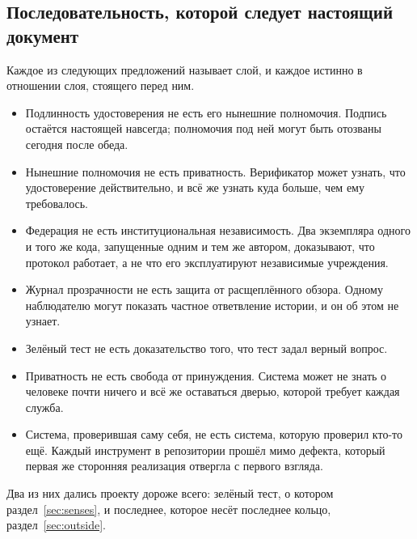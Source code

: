 \subsection{Последовательность, которой следует настоящий документ}

Каждое из следующих предложений называет слой, и каждое истинно в отношении слоя, стоящего перед
ним.

\begin{itemize}
  \item Подлинность удостоверения не есть его нынешние полномочия. Подпись остаётся настоящей
    навсегда; полномочия под ней могут быть отозваны сегодня после обеда.
  \item Нынешние полномочия не есть приватность. Верификатор может узнать, что удостоверение
    действительно, и всё же узнать куда больше, чем ему требовалось.
  \item Федерация не есть институциональная независимость. Два экземпляра одного и того же кода,
    запущенные одним и тем же автором, доказывают, что протокол работает, а не что его
    эксплуатируют независимые учреждения.
  \item Журнал прозрачности не есть защита от расщеплённого обзора. Одному наблюдателю могут
    показать частное ответвление истории, и он об этом не узнает.
  \item Зелёный тест не есть доказательство того, что тест задал верный вопрос.
  \item Приватность не есть свобода от принуждения. Система может не знать о человеке почти
    ничего и всё же оставаться дверью, которой требует каждая служба.
  \item Система, проверившая саму себя, не есть система, которую проверил кто-то ещё. Каждый
    инструмент в репозитории прошёл мимо дефекта, который первая же сторонняя реализация
    отвергла с первого взгляда.
\end{itemize}

Два из них дались проекту дороже всего: зелёный тест, о котором раздел~\ref{sec:senses}, и
последнее, которое несёт последнее кольцо, раздел~\ref{sec:outside}.

